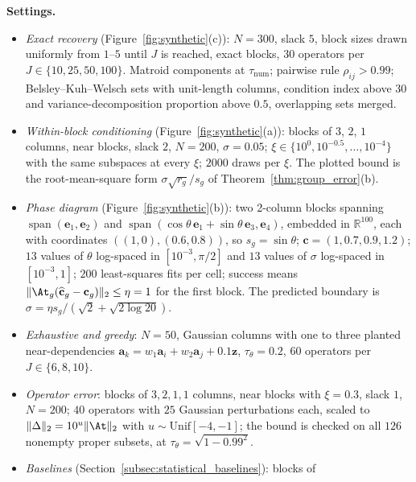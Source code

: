\noindent\textbf{Settings.}
\begin{itemize}[leftmargin=*,itemsep=0pt,topsep=2pt]
  \item \emph{Exact recovery} (Figure~\ref{fig:synthetic}(c)): \(N=300\), slack \(5\),
  block sizes drawn uniformly from \(1\)--\(5\) until \(J\) is reached, exact blocks,
  \(30\) operators per \(J\in\{10,25,50,100\}\).  Matroid components at
  \(\tau_{\mathrm{num}}\); pairwise rule \(\rho_{ij}>0.99\); Belsley--Kuh--Welsch sets
  with unit-length columns, condition index above \(30\) and variance-decomposition
  proportion above \(0.5\), overlapping sets merged.
  \item \emph{Within-block conditioning} (Figure~\ref{fig:synthetic}(a)): blocks of
  \(3\), \(2\), \(1\) columns, near blocks, slack \(2\), \(N=200\), \(\sigma=0.05\);
  \(\xi\in\{10^0,10^{-0.5},\dots,10^{-4}\}\) with the same subspaces at every
  \(\xi\); \(2000\) draws per \(\xi\).  The plotted bound is the root-mean-square
  form \(\sigma\sqrt{r_g}/s_g\) of Theorem~\ref{thm:group_error}(b).
  \item \emph{Phase diagram} (Figure~\ref{fig:synthetic}(b)): two 2-column blocks
  spanning \(\operatorname{span}(\mathbf e_1,\mathbf e_2)\) and
  \(\operatorname{span}(\cos\theta\,\mathbf e_1+\sin\theta\,\mathbf e_3,\mathbf e_4)\),
  embedded in \(\mathbb R^{100}\), each with coordinates \(((1,0),(0.6,0.8))\), so
  \(s_g=\sin\theta\); \(\mathbf c=(1,0.7,0.9,1.2)\); \(13\) values of \(\theta\)
  log-spaced in \([10^{-3},\pi/2]\) and \(13\) values of \(\sigma\) log-spaced in
  \([10^{-3},1]\); \(200\) least-squares fits per cell; success means
  \(\|\At_g(\widehat{\mathbf c}_g-\mathbf c_g)\|_2\le\eta=1\) for the first block.
  The predicted boundary is \(\sigma=\eta s_g/(\sqrt2+\sqrt{2\log20})\).
  \item \emph{Exhaustive and greedy}: \(N=50\), Gaussian columns with one to three
  planted near-dependencies \(\mathbf a_k=w_1\mathbf a_i+w_2\mathbf a_j+0.1\mathbf z\),
  \(\tau_\theta=0.2\), \(60\) operators per \(J\in\{6,8,10\}\).
  \item \emph{Operator error}: blocks of \(3,2,1,1\) columns, near blocks with
  \(\xi=0.3\), slack \(1\), \(N=200\); \(40\) operators with \(25\) Gaussian perturbations
  each, scaled to \(\|\Delta\|_2=10^u\|\At\|_2\) with \(u\sim\mathrm{Unif}[-4,-1]\); the
  bound is checked on all \(126\) nonempty proper subsets, at
  \(\tau_\theta=\sqrt{1-0.99^2}\).
  \item \emph{Baselines} (Section~\ref{subsec:statistical_baselines}): blocks of

\end{itemize}
